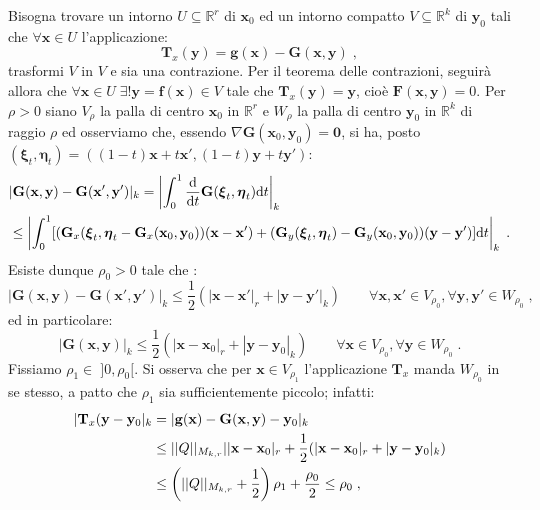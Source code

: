 \documentclass[a4paper,12pt]{report}
\theoremstyle{plain}
\theoremstyle{definition}
\theoremstyle{remark}
\newcommand{\BF}[1]{\boldsymbol{#1}}
\newcommand{\diff}[1]{\mathrm{d}#1}
\numberwithin{equation}{section}
\begin{document}
Bisogna trovare un intorno $U \subseteq \mathbb{R}^r$ di $\mathbf{x}_0$ ed un intorno compatto $V \subseteq \mathbb{R}^k$ di $\mathbf{y}_0$ tali che $\forall \mathbf{x} \in U$ l'applicazione:
\begin{equation}
\mathbf{T}_x(\mathbf{y})=\mathbf{g}(\mathbf{x})-\mathbf{G}(\mathbf{x},\mathbf{y})\;,
\end{equation}
trasformi $V$ in $V$ e sia una contrazione. Per il teorema delle contrazioni, seguirà allora che $\forall \mathbf{x} \in U\; \exists!
\mathbf{y}=\mathbf{f}(\mathbf{x}) \in V$ tale che $\mathbf{T}_x(\mathbf{y})=\mathbf{y}$, cioè $\mathbf{F}(\mathbf{x},\mathbf{y})=0$. Per $\rho>0$ siano $V_{\rho}$ la palla di centro $\mathbf{x}_0$ in $\mathbb{R}^r$ e $W_{\rho}$ la palla di centro $\mathbf{y}_0$ in $\mathbb{R}^k$ di raggio $\rho$ ed osserviamo che, essendo $\nabla \mathbf{G}(\mathbf{x}_0,\mathbf{y}_0)=\mathbf{0}$, si ha, posto $(\BF{\xi}_t,\BF{\eta}_t)=((1-t)\mathbf{x}+t\mathbf{x}',(1-t)\mathbf{y}+t\mathbf{y}')$:
\begin{align}
&|\mathbf{G}(\mathbf{x},\mathbf{y})-\mathbf{G}(\mathbf{x}',\mathbf{y}')|_k = \left|\int_0^1 \frac{\diff}{\diff{t}}\mathbf{G}(\BF{\xi}_t,\BF{\eta}_t)\diff{t}\right|_k \notag \\
&\le \left|\int_0^1[(\mathbf{G}_x(\BF{\xi}_t,\BF{\eta}_t-\mathbf{G}_x(\mathbf{x}_0,\mathbf{y}_0))(\mathbf{x}-\mathbf{x}')+(\mathbf{G}_y(\BF{\xi}_t,\BF{\eta}_t)-\mathbf{G}_y(\mathbf{x}_0,\mathbf{y}_0))(\mathbf{y}-\mathbf{y}')]\diff{t}\right|_k\;.
\end{align}
Esiste dunque $\rho_0>0$ tale che :
\begin{equation}
|\mathbf{G}(\mathbf{x},\mathbf{y})-\mathbf{G}(\mathbf{x}',\mathbf{y}')|_k \le \frac{1}{2}(|\mathbf{x}-\mathbf{x}'|_r+|\mathbf{y}-\mathbf{y}'|_k) \qquad \forall \mathbf{x},\mathbf{x}' \in V_{\rho_0},\forall \mathbf{y},\mathbf{y}' \in W_{\rho_0}\;,
\end{equation}
ed in particolare:
\begin{equation}
|\mathbf{G}(\mathbf{x},\mathbf{y})|_k \le \frac{1}{2}(|\mathbf{x}-\mathbf{x}_0|_r+|\mathbf{y}-\mathbf{y}_0|_k)
 \qquad \forall \mathbf{x} \in V_{\rho_0},\forall \mathbf{y} \in W_{\rho_0}\;.
\end{equation}
Fissiamo $\rho_1 \in\; ]0,\rho_0[$. Si osserva che per $\mathbf{x} \in V_{\rho_1}$ l'applicazione $\mathbf{T}_x$ manda $W_{\rho_0}$ in se
stesso, a patto che $\rho_1$ sia sufficientemente piccolo; infatti:
\begin{align}
|\mathbf{T}_x(\mathbf{y}-\mathbf{y}_0|_k &= |\mathbf{g}(\mathbf{x})-\mathbf{G}(\mathbf{x},\mathbf{y})-\mathbf{y}_0|_k \notag \\
&\le ||Q||_{M_{k,r}}||\mathbf{x}-\mathbf{x}_0|_r+\frac{1}{2}(|\mathbf{x}-\mathbf{x}_0|_r+|\mathbf{y}-\mathbf{y}_0|_k) \notag \\
&\le \left(||Q||_{M_{k,r}}+\frac{1}{2}\right)\rho_1+\frac{\rho_0}{2}\le \rho_0\;,
\end{align}
\end{document}

